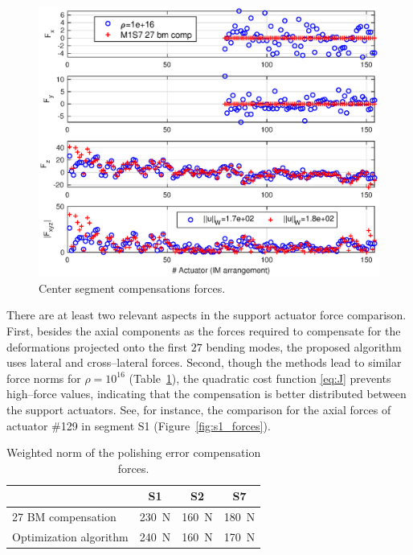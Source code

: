 \documentclass{gmto}
\begin{document}
\begin{figure}[!htb]
\centering
\includegraphics[width=\textwidth]{./pictures/s7_comp_Forces.eps}
\caption{Center segment compensations forces.}
\label{fig:s7_forces}
\end{figure}
%
% 
There are at least two relevant aspects in the support actuator force comparison. First, besides the axial components %
 as the forces required to compensate for the deformations projected onto the first $27$ bending modes, the proposed algorithm uses lateral %
  and cross--lateral %
  forces. Second, though the methods lead to similar force norms for $\rho=10^{16}$ (Table~\ref{tab:Wnorm_u}), the quadratic cost function \eqref{eq:J} prevents high--force values, indicating that the compensation is better distributed between the support actuators. See, for instance, the comparison for the axial forces of actuator \#129 in segment \textsf{S1} (Figure~\ref{fig:s1_forces}).
\begin{table}[!htb]
\centering
\caption{Weighted norm of the polishing error compensation forces.}
\label{tab:Wnorm_u}
\begin{tabular}{l|ccc}
 & \textsf{S1} & \textsf{S2} & \textsf{S7}\\
 \hline
27 BM compensation & \SI{230}{\newton} & \SI{160}{\newton} & \SI{180}{\newton}\\
Optimization algorithm & \SI{240}{\newton} & \SI{160}{\newton} & \SI{170}{\newton}
\end{tabular}
\end{table}
\end{document}
